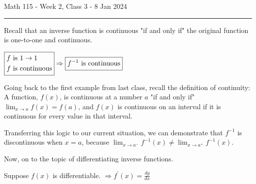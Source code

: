 \documentclass{article}
\begin{document}
Math 115 - Week 2, Class 3 - 8 Jan 2024
\hrule

\vspace{10pt}

Recall that an inverse function is continuous "if and only if" the original function is one-to-one and continuous.

\begin{center}
$\boxed{\begin{aligned}
f&\textnormal{ is }1\to1\\
f&\textnormal{ is continuous}
\end{aligned}}
\Rightarrow
\boxed{\begin{aligned}
f^{-1}\textnormal{ is continuous}
\end{aligned}}$
\end{center}

Going back to the first example from last class, recall the definition of continuity: A function, $f(x)$, is continuous at a number $a$ "if and only if" $\lim_{x\to a}f(x)=f(a)$, and $f(x)$ is continuous on an interval if it is continuous for every value in that interval.

\vspace{10pt}

Transferring this logic to our current situation, we can demonstrate that $f^{-1}$ is discontinuous when $x=a$, because $\lim_{x\to a^-}f^{-1}(x)\neq\lim_{x\to a^+}f^{-1}(x)$.

\begin{center}
\end{center}

Now, on to the topic of differentiating inverse functions.

\vspace{10pt}

Suppose $f(x)$ is differentiable. $\Rightarrow f^\prime(x)=\frac{dy}{dx}$
\end{document}
